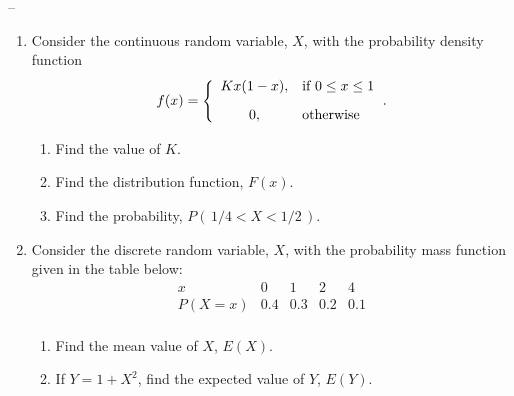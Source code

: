 \documentclass[11pt,paper=a4,abstract=on,parskip=half,DIV=calc,compact]{scrartcl}
\let\originalleft\left
\let\originalright\right
\renewcommand{\left}{\mathopen{}\mathclose\bgroup\originalleft}
\renewcommand{\right}{\aftergroup\egroup\originalright}
\begin{document}
\begin{ExerciseList}
 --
\begin{enumerate}
\item
{Consider the continuous random variable, $X$, with the
probability density function
$$
f(x) = \left\{ \begin{array}{cl} \displaystyle Kx(1-x), & \mbox{if}~ 0 \leq x \leq 1   \\[2ex]
0, & \mbox{otherwise}
\end{array} \right..
$$
}
\begin{enumerate}
\item
{Find the value of $K$.}
\item
{Find the distribution function, $F(x)$.}
\item
{Find the probability, $P(\, 1/4<X<1/2 \,)$.}
\end{enumerate}
\item
{Consider the discrete random variable, $X$, with the
probability mass function given in the table below:\\
\[
\begin{array}{c|cccc}
x      & 0   &  1  &  2  & 4   \\ \hline
P(X=x) & 0.4 & 0.3 & 0.2 & 0.1 \\
\end{array}
\]
}
\begin{enumerate}
\item
{Find the mean value of $X$, $E(X)$.}
\item 
{If $Y = {1+X^2}$, find the expected value of $Y$, $E(Y)$.}
\end{enumerate}

\end{enumerate}


\end{ExerciseList}
\end{document}
